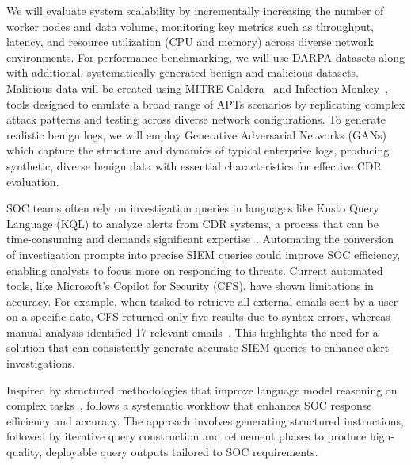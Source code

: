 \eval  We will evaluate system scalability by incrementally increasing the number of worker nodes and data volume, monitoring key metrics such as throughput, latency, and resource utilization (CPU and memory) across diverse network environments. For performance benchmarking, we will use DARPA datasets along with additional, systematically generated benign and malicious datasets. Malicious data will be created using MITRE Caldera~\cite{caldera} and Infection Monkey~\cite{infectionmonkey}, tools designed to emulate a broad range of APTs scenarios by replicating complex attack patterns and testing across diverse network configurations. To generate realistic benign logs, we will employ Generative Adversarial Networks (GANs)~\cite{graphrnn,graphvae} which capture the structure and dynamics of typical enterprise logs, producing synthetic, diverse benign data with essential characteristics for effective CDR evaluation.





 SOC teams often rely on investigation queries in languages like Kusto Query Language (KQL) to analyze alerts from CDR systems, a process that can be time-consuming and demands significant expertise~\cite{esgstudy,alahmadi202299socstudy}. Automating the conversion of investigation prompts into precise SIEM queries could improve SOC efficiency, enabling analysts to focus more on responding to threats. Current automated tools, like Microsoft's Copilot for Security (CFS), have shown limitations in accuracy. For example, when tasked to retrieve all external emails sent by a user on a specific date, CFS returned only five results due to syntax errors, whereas manual analysis identified 17 relevant emails~\cite{microsoftseccopilot}. This highlights the need for a solution that can consistently generate accurate SIEM queries to enhance alert investigations.



 Inspired by structured methodologies that improve language model reasoning on complex tasks~\cite{ouyang2023structured}, \Sysb follows a systematic workflow that enhances SOC response efficiency and accuracy. The approach involves generating structured instructions, followed by iterative query construction and refinement phases to produce high-quality, deployable query outputs tailored to SOC requirements.

